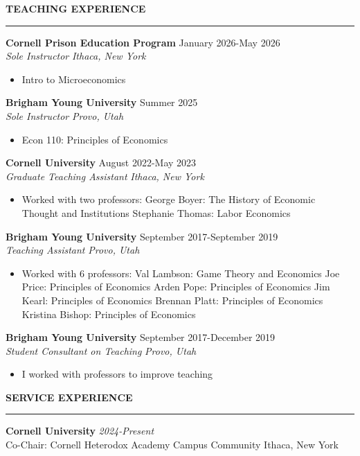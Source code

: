 \documentclass[11pt]{article}
\newenvironment{rSection}[1]{
  \vspace{1.5em}
  \noindent\textbf{\MakeUppercase{#1}}
  \vspace{0.2em}\hrule\vspace{0.5em}
}{}
\newenvironment{rSubsection}[4]{
  \noindent\textbf{#1} \hfill #2 \\
  \textit{#3} \hfill \textit{#4}
  \begin{itemize}[leftmargin=1.5em, itemsep=-0.2em, topsep=0pt, parsep=0pt]
}{
  \end{itemize}
  \vspace{0.5em}
}
\begin{document}
\begin{rSection}{Teaching Experience}

\begin{rSubsection}{Cornell Prison Education Program}{January 2026-May 2026}{Sole Instructor}{Ithaca, New York}
    \item Intro to Microeconomics
\end{rSubsection}

\begin{rSubsection}{Brigham Young University}{Summer 2025}{Sole Instructor}{Provo, Utah}
    \item Econ 110: Principles of Economics
\end{rSubsection}

\begin{rSubsection}{Cornell University}{August 2022-May 2023}{Graduate Teaching Assistant}{Ithaca, New York}
    \item Worked with two professors:
    \subitem George Boyer: The History of Economic Thought and Institutions
    \subitem Stephanie Thomas: Labor Economics
\end{rSubsection}

\begin{rSubsection}{Brigham Young University}{September 2017-September 2019}{Teaching Assistant}{Provo, Utah}
    \item Worked with 6 professors:
    \subitem Val Lambson: Game Theory and Economics
    \subitem Joe Price: Principles of Economics
    \subitem Arden Pope: Principles of Economics
    \subitem Jim Kearl: Principles of Economics
    \subitem Brennan Platt: Principles of Economics
    \subitem Kristina Bishop: Principles of Economics
\end{rSubsection}

\begin{rSubsection}{Brigham Young University}{September 2017-December 2019}{Student Consultant on Teaching}{Provo, Utah}
    \item I worked with professors to improve teaching
\end{rSubsection}

\end{rSection}


\begin{rSection}{Service Experience}
    \textbf{Cornell University} \hfill \textit{2024-Present}\\
    Co-Chair: Cornell Heterodox Academy Campus Community \hfill Ithaca, New York
\end{rSection}
\end{document}
